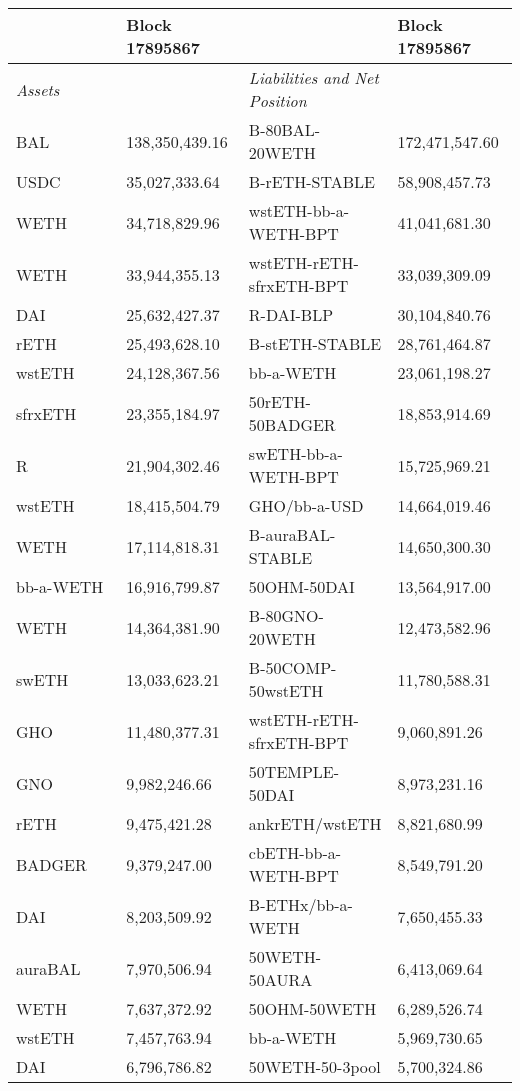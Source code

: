 
\begin{longtable}{@{}p{0.25\linewidth}p{0.25\linewidth}p{0.25\linewidth}p{0.25\linewidth}@{}}

\toprule


& Block 17895867 & & Block 17895867 \\

\midrule
\textit{Assets} & & \textit{Liabilities and Net Position} \\
BAL & 138,350,439.16 & B-80BAL-20WETH &172,471,547.60 \\
USDC & 35,027,333.64 & B-rETH-STABLE &58,908,457.73 \\
WETH & 34,718,829.96 & wstETH-bb-a-WETH-BPT &41,041,681.30 \\
WETH & 33,944,355.13 & wstETH-rETH-sfrxETH-BPT &33,039,309.09 \\
DAI & 25,632,427.37 & R-DAI-BLP &30,104,840.76 \\
rETH & 25,493,628.10 & B-stETH-STABLE &28,761,464.87 \\
wstETH & 24,128,367.56 & bb-a-WETH &23,061,198.27 \\
sfrxETH & 23,355,184.97 & 50rETH-50BADGER &18,853,914.69 \\
R & 21,904,302.46 & swETH-bb-a-WETH-BPT &15,725,969.21 \\
wstETH & 18,415,504.79 & GHO/bb-a-USD &14,664,019.46 \\
WETH & 17,114,818.31 & B-auraBAL-STABLE &14,650,300.30 \\
bb-a-WETH & 16,916,799.87 & 50OHM-50DAI &13,564,917.00 \\
WETH & 14,364,381.90 & B-80GNO-20WETH &12,473,582.96 \\
swETH & 13,033,623.21 & B-50COMP-50wstETH &11,780,588.31 \\
GHO & 11,480,377.31 & wstETH-rETH-sfrxETH-BPT &9,060,891.26 \\
GNO & 9,982,246.66 & 50TEMPLE-50DAI &8,973,231.16 \\
rETH & 9,475,421.28 & ankrETH/wstETH &8,821,680.99 \\
BADGER & 9,379,247.00 & cbETH-bb-a-WETH-BPT &8,549,791.20 \\
DAI & 8,203,509.92 & B-ETHx/bb-a-WETH  &7,650,455.33 \\
auraBAL & 7,970,506.94 & 50WETH-50AURA &6,413,069.64 \\
WETH & 7,637,372.92 & 50OHM-50WETH &6,289,526.74 \\
wstETH & 7,457,763.94 & bb-a-WETH &5,969,730.65 \\
DAI & 6,796,786.82 & 50WETH-50-3pool &5,700,324.86 \\

\end{longtable}
